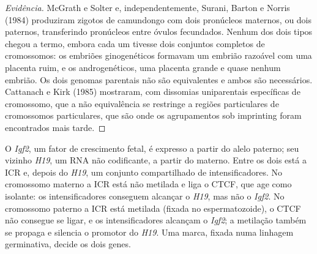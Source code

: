 \begin{proof}[Evidência]
McGrath e Solter e, independentemente, Surani, Barton e Norris (1984)
produziram zigotos de camundongo com dois pronúcleos maternos, ou dois
paternos, transferindo pronúcleos entre óvulos fecundados. Nenhum dos
dois tipos chegou a termo, embora cada um tivesse dois conjuntos
completos de cromossomos: os embriões ginogenéticos formavam um
embrião razoável com uma placenta ruim, e os androgenéticos, uma
placenta grande e quase nenhum embrião. Os dois genomas parentais não
são equivalentes e ambos são necessários. Cattanach e Kirk (1985)
mostraram, com dissomias uniparentais específicas de cromossomo, que a
não equivalência se restringe a regiões particulares de cromossomos
particulares, que são onde os agrupamentos sob imprinting foram
encontrados mais tarde.
\end{proof}

\begin{example}\label{ex:b3:chromatin-epigenetics:igf2}
O \emph{Igf2}, um fator de crescimento fetal, é expresso a partir do
alelo paterno; seu vizinho \emph{H19}, um RNA não codificante, a
partir do materno. Entre os dois está a ICR e, depois do \emph{H19},
um conjunto compartilhado de intensificadores. No cromossomo materno a
ICR está não metilada e liga o CTCF, que age como isolante: os
intensificadores conseguem alcançar o \emph{H19}, mas não o
\emph{Igf2}. No cromossomo paterno a ICR está metilada (fixada no
espermatozoide), o CTCF não consegue se ligar, e os intensificadores
alcançam o \emph{Igf2}; a metilação também se propaga e silencia o
promotor do \emph{H19}. Uma marca, fixada numa linhagem germinativa,
decide os dois genes.
\end{example}

